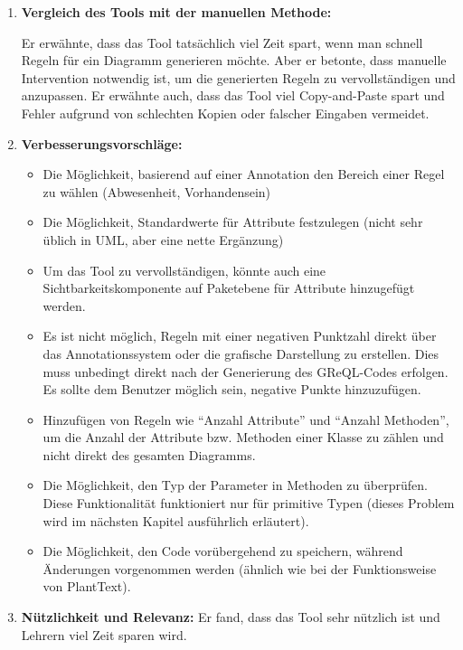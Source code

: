 \begin{enumerate}[itemsep=8pt, parsep=5pt]
    \item \textbf{Vergleich des Tools mit der manuellen Methode:}

    Er erwähnte, dass das Tool tatsächlich viel Zeit spart, wenn man schnell Regeln für ein Diagramm generieren möchte.
    Aber er betonte, dass manuelle Intervention notwendig ist, um die generierten Regeln zu vervollständigen und
    anzupassen. Er erwähnte auch, dass das Tool viel Copy-and-Paste spart und Fehler aufgrund von schlechten Kopien
    oder falscher Eingaben vermeidet.

    \item \textbf{Verbesserungsvorschläge:}

    \begin{itemize}[itemsep=8pt, parsep=5pt]
        \item Die Möglichkeit, basierend auf einer Annotation den Bereich einer Regel zu wählen
        (Abwesenheit, Vorhandensein)
        \item Die Möglichkeit, Standardwerte für Attribute festzulegen (nicht sehr üblich in UML, aber eine nette
        Ergänzung)
        \item Um das Tool zu vervollständigen, könnte auch eine Sichtbarkeitskomponente auf Paketebene für Attribute
        hinzugefügt werden.
        \item Es ist nicht möglich, Regeln mit einer negativen Punktzahl direkt über das Annotationssystem oder die
        grafische Darstellung zu erstellen. Dies muss unbedingt direkt nach der Generierung des GReQL-Codes erfolgen.
        Es sollte dem Benutzer möglich sein, negative Punkte hinzuzufügen.
        \item Hinzufügen von Regeln wie ``Anzahl Attribute'' und ``Anzahl Methoden'', um die Anzahl der Attribute bzw.
        Methoden einer Klasse zu zählen und nicht direkt des gesamten Diagramms.
        \item Die Möglichkeit, den Typ der Parameter in Methoden zu überprüfen. Diese Funktionalität funktioniert nur
        für primitive Typen (dieses Problem wird im nächsten Kapitel ausführlich erläutert).
        \item Die Möglichkeit, den Code vorübergehend zu speichern, während Änderungen vorgenommen werden (ähnlich wie
        bei der Funktionsweise von PlantText).
    \end{itemize}

    \item \textbf{Nützlichkeit und Relevanz:}
    Er fand, dass das Tool sehr nützlich ist und Lehrern viel Zeit sparen wird.


\end{enumerate}
